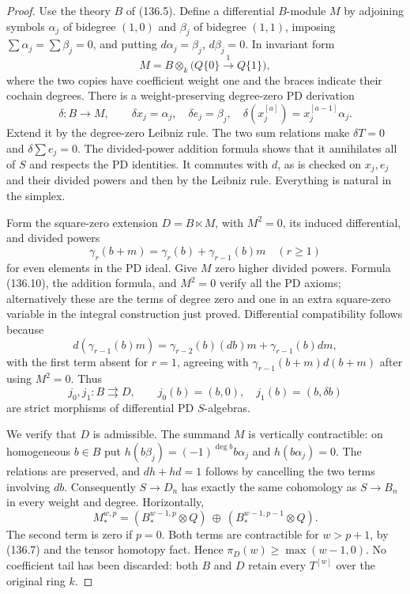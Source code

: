 \begin{proof}
Use the theory $B$ of (136.5).  Define a differential
$B$-module $M$ by adjoining symbols $\alpha_j$ of bidegree
$(1,0)$ and $\beta_j$ of bidegree $(1,1)$, imposing
$\sum\alpha_j=\sum\beta_j=0$, and putting
$d\alpha_j=\beta_j$, $d\beta_j=0$.
In invariant form
\[
 M=B\otimes_k\bigl(Q\{0\}\xrightarrow{1}Q\{1\}\bigr),
                                                               \tag{136.8}
\]
where the two copies have coefficient weight one and the
braces indicate their cochain degrees.  There is a
weight-preserving degree-zero PD derivation
\[
 \delta:B\longrightarrow M,\qquad
 \delta x_j=\alpha_j,\quad\delta e_j=\beta_j,\quad
 \delta(x_j^{[a]})=x_j^{[a-1]}\alpha_j .                    \tag{136.9}
\]
Extend it by the degree-zero Leibniz rule.  The two sum
relations make $\delta T=0$ and $\delta\sum e_j=0$.
The divided-power addition formula shows that it annihilates
all of $S$ and respects the PD identities.  It commutes
with $d$, as is checked on $x_j,e_j$ and their divided
powers and then by the Leibniz rule.  Everything is natural
in the simplex.

Form the square-zero extension $D=B\ltimes M$, with
$M^2=0$, its induced differential, and divided powers
\[
 \gamma_r(b+m)=\gamma_r(b)+\gamma_{r-1}(b)m
 \quad(r\geq1)                                             \tag{136.10}
\]
for even elements in the PD ideal.  Give $M$ zero higher
divided powers.  Formula (136.10), the addition formula,
and $M^2=0$ verify all the PD axioms; alternatively these
are the terms of degree zero and one in an extra
square-zero variable in the integral construction just
proved.  Differential compatibility follows because
\[
 d(\gamma_{r-1}(b)m)
  =\gamma_{r-2}(b)(db)m+\gamma_{r-1}(b)dm,
\]
with the first term absent for $r=1$, agreeing with
$\gamma_{r-1}(b+m)d(b+m)$ after using $M^2=0$.
Thus
\[
 j_0,j_1:B\rightrightarrows D,
 \qquad j_0(b)=(b,0),\quad j_1(b)=(b,\delta b)              \tag{136.11}
\]
are strict morphisms of differential PD $S$-algebras.

We verify that $D$ is admissible.  The summand $M$ is
vertically contractible: on homogeneous $b\in B$ put
$h(b\beta_j)=(-1)^{\deg b}b\alpha_j$ and
$h(b\alpha_j)=0$.  The relations are preserved, and
$dh+hd=1$ follows by cancelling the two terms involving
$db$.  Consequently $S\to D_n$ has exactly the same
cohomology as $S\to B_n$ in every weight and degree.
Horizontally,
\[
 M_*^{w,p}=
  (B_*^{w-1,p}\otimes Q)\ \oplus\
  (B_*^{w-1,p-1}\otimes Q).                                \tag{136.12}
\]
The second term is zero if $p=0$.  Both terms are
contractible for $w>p+1$, by (136.7) and the tensor
homotopy fact.  Hence $\pi_D(w)\geq\max(w-1,0)$.
No coefficient tail has been discarded: both $B$ and
$D$ retain every $T^{[w]}$ over the original ring $k$.


\end{proof}
